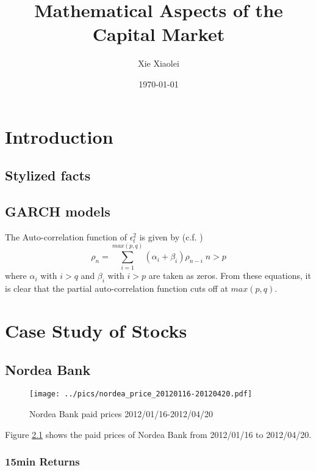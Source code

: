 \documentclass{book}
\title{Mathematical Aspects of the Capital Market}
\author{Xie Xiaolei}
\date{\today}
\begin{document}
\maketitle
\tableofcontents

\chapter{Introduction}
\section{Stylized facts}

\section{GARCH models}
The Auto-correlation function of $\epsilon_t^2$ is given by (c.f. \cite{Bollerslev87})
$$
\rho_n = \sum_{i=1}^{max(p,q)} (\alpha_i + \beta_i) \rho_{n-i}
\;n > p
$$
where $\alpha_i$ with $i > q$ and $\beta_i$ with $i > p$ are taken as
zeros. From these equations, it is clear that the partial
auto-correlation function cuts off at $max(p, q)$.


\chapter{Case Study of Stocks}
\section{Nordea Bank}
\begin{figure}[ht]
  \centering
  \texttt{[image: ../pics/nordea\_price\_20120116-20120420.pdf]}
  \caption{Nordea Bank paid prices 2012/01/16-2012/04/20}
  \label{fig:Nordea}
\end{figure}
Figure \ref{fig:Nordea} shows the paid prices of Nordea Bank from
2012/01/16 to 2012/04/20.

\subsection{15min Returns}
\end{document}
